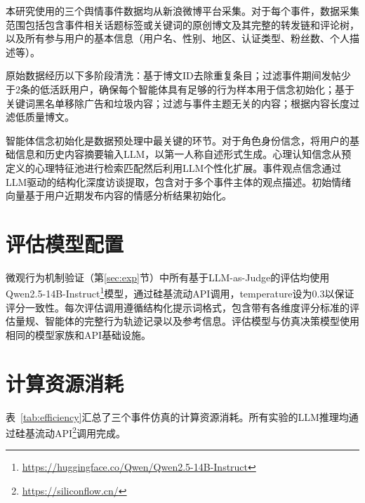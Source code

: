 \documentclass[a4paper,fleqn]{cas-dc}
\begin{document}
本研究使用的三个舆情事件数据均从新浪微博平台采集。对于每个事件，数据采集范围包括包含事件相关话题标签或关键词的原创博文及其完整的转发链和评论树，以及所有参与用户的基本信息（用户名、性别、地区、认证类型、粉丝数、个人描述等）。

原始数据经历以下多阶段清洗：基于博文ID去除重复条目；过滤事件期间发帖少于2条的低活跃用户，确保每个智能体具有足够的行为样本用于信念初始化；基于关键词黑名单移除广告和垃圾内容；过滤与事件主题无关的内容；根据内容长度过滤低质量博文。

智能体信念初始化是数据预处理中最关键的环节。对于角色身份信念，将用户的基础信息和历史内容摘要输入LLM，以第一人称自述形式生成。心理认知信念从预定义的心理特征池进行检索匹配然后利用LLM个性化扩展。事件观点信念通过LLM驱动的结构化深度访谈提取，包含对于多个事件主体的观点描述。初始情绪向量基于用户近期发布内容的情感分析结果初始化。

\section{评估模型配置}

微观行为机制验证（第\ref{sec:exp}节）中所有基于LLM-as-Judge的评估均使用Qwen2.5-14B-Instruct\footnote{\url{https://huggingface.co/Qwen/Qwen2.5-14B-Instruct}}模型，通过硅基流动API调用，temperature设为0.3以保证评分一致性。每次评估调用遵循结构化提示词格式，包含带有各维度评分标准的评估量规、智能体的完整行为轨迹记录以及参考信息。评估模型与仿真决策模型使用相同的模型家族和API基础设施。

\section{计算资源消耗}
\label{app:efficiency}

表~\ref{tab:efficiency}汇总了三个事件仿真的计算资源消耗。所有实验的LLM推理均通过硅基流动API\footnote{\url{https://siliconflow.cn/}}调用完成。
\end{document}

